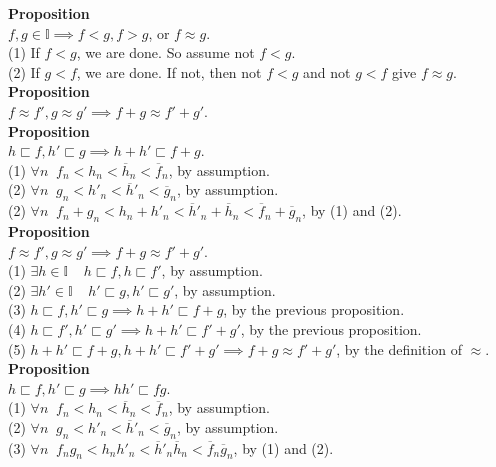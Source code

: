 \documentclass{article}
\newcommand{\zeqs}{ \mathbb{I}}
\newcommand{\of}{ \overline f}
\newcommand{\og}{ \overline g}
\newcommand{\oh}{ \overline h}
\newcommand{\forks}{ \sqsubset}
\begin{document}
\textbf{Proposition}\\
$f,g \in \zeqs \implies f<g, f>g$, or $f \approx g$.\\

(1) If $f < g$, we are done. So assume not $f < g$.\\
(2) If $g < f$, we are done. If not, then not $f < g$ and not $g < f$ give $f \approx g$.\\


\textbf{Proposition}\\
$f \approx f', g \approx g' \implies f + g \approx f' + g'$.\\


\textbf{Proposition}\\
$h \forks f, h' \forks g \implies h + h' \forks f + g$.\\

(1) $\forall n \;\; f_n < h_n < \oh_n < \of_n$, by assumption.\\
(2) $\forall n \;\; g_n < h'_n < \oh'_n < \og_n$, by assumption.\\
(2) $\forall n \;\; f_n + g_n < h_n + h'_n < \oh'_n + \oh_n <  \of_n  + \og_n$, by (1) and (2).\\ 

\textbf{Proposition}\\
$f \approx f', g \approx g' \implies f + g \approx f' + g'$.\\

(1) $\exists h \in \zeqs \;\;\;\; h \forks f, h \forks f'$, by assumption.\\
(2) $\exists h' \in \zeqs \;\;\;\; h' \forks g, h' \forks g'$, by assumption.\\
(3) $h \forks f, h' \forks g \implies h + h' \forks f + g$, by the previous proposition.\\
(4) $h \forks f', h' \forks g' \implies h + h' \forks f' + g'$, by the previous proposition.\\
(5) $h + h' \forks f + g,h + h' \forks f' + g' \implies f + g \approx f' + g'$, by the definition of $\approx$.\\

\textbf{Proposition}\\
$h \forks f, h' \forks g \implies hh' \forks fg$.\\

(1) $\forall n \;\; f_n < h_n < \oh_n < \of_n$, by assumption.\\
(2) $\forall n \;\; g_n < h'_n < \oh'_n < \og_n$, by assumption.\\
(3) $\forall n \;\; f_n g_n < h_n h'_n < \oh'_n \oh_n < \of_n \og_n$, by (1) and (2).\\ 
\end{document}
